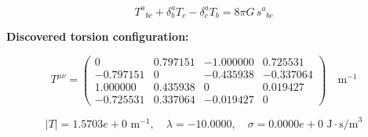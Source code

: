 
\begin{equation}
  T^a{}_{bc} + \delta^a_b T_c - \delta^a_c T_b = 8\pi G \, s^a{}_{bc}
\end{equation}

\textbf{Discovered torsion configuration:}

\begin{equation}
  T^{\mu\nu} = \begin{pmatrix}
    0 & 0.797151 & -1.000000 & 0.725531 \\
    -0.797151 & 0 & -0.435938 & -0.337064 \\
    1.000000 & 0.435938 & 0 & 0.019427 \\
    -0.725531 & 0.337064 & -0.019427 & 0
  \end{pmatrix} \quad \text{m}^{-1}
\end{equation}

\begin{equation}
  |T| = 1.5703e+0 \text{ m}^{-1}, \quad
  \lambda = -10.0000, \quad
  \sigma = 0.0000e+0 \text{ J}\cdot\text{s/m}^3
\end{equation}